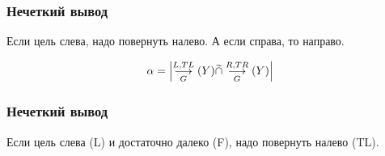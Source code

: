 \documentclass[24pt,pdf,hyperref={unicode}]{beamer}
\begin{document}
\begin{frame}\frametitle{Нечеткий вывод}
\begin{center}
Если цель слева, надо повернуть налево.
А если справа, то направо.
\end{center}

$$
\alpha=\left|\overset{L,TL}{\underset{G}{\longrightarrow}}(Y)\widetilde{\cap} \overset{R,TR}{\underset{G}{\longrightarrow}}(Y)\right|
$$
\end{frame}

\begin{frame}\frametitle{Нечеткий вывод}
\begin{center}
Если цель слева (L) и достаточно далеко (F), надо повернуть налево (TL).
\end{center}






\end{frame}
\end{document}
